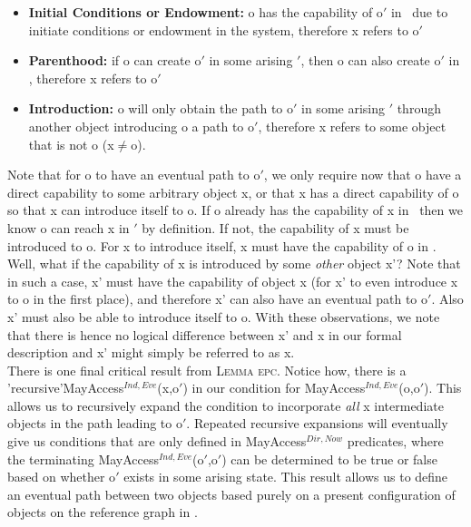 \documentclass[a4paper,11pt,twoside]{article}
\newcommand{\loneq} {$\neq$}
\newcommand{\losigma}{\text{$\upsigma$}}
\begin{document}
\begin{itemize}
\item \textbf{Initial Conditions or Endowment:} o has the capability of o$'$ in \losigma\ due to initiate conditions or endowment in the system, therefore x refers to o$'$
\item \textbf{Parenthood:} if o can create o$'$ in some arising \losigma$'$, then o can also create o$'$ in \losigma, therefore x refers to o$'$
\item \textbf{Introduction:} o will only obtain the path to o$'$ in some arising \losigma$'$ through another object introducing o a path to o$'$, therefore x refers to some object that is not o (x\loneq o). 
\end{itemize}

Note that for o to have an eventual path to o$'$, we only require now that o have a direct capability to some arbitrary object x, or that x has a direct capability of o so that x can introduce itself to o. If o already has the capability of x in \losigma\ then we know o can reach x in \losigma$'$ by definition. If not, the capability of x must be introduced to o. For x to introduce itself, x must have the capability of o in \losigma.\\

Well, what if the capability of x is introduced by some \textit{other} object x'? Note that in such a case, x' must have the capability of object x (for x' to even introduce x to o in the first place), and therefore x' can also have an eventual path to o$'$. Also x' must also be able to introduce itself to o. With these observations, we note that there is hence no logical difference between x' and x in our formal description and x' might simply be referred to as x.\\

There is one final critical result from \textsc{Lemma epc}.
Notice how, there is a 'recursive'\linebreak MayAccess$^{Ind,Eve}$(x,o$'$) in our condition for MayAccess$^{Ind,Eve}$(o,o$'$).
This allows us to recursively expand the condition to incorporate \textit{all} x intermediate objects in the path leading to o$'$. Repeated recursive expansions will eventually give us conditions that are only defined in MayAccess$^{Dir,Now}$ predicates, where the terminating MayAccess$^{Ind,Eve}$(o$'$,o$'$) can be determined to be true or false based on whether o$'$ exists in some arising state. This result allows us to define an eventual path between two objects based purely on a present configuration of objects on the reference graph in \losigma.\\
\end{document}
